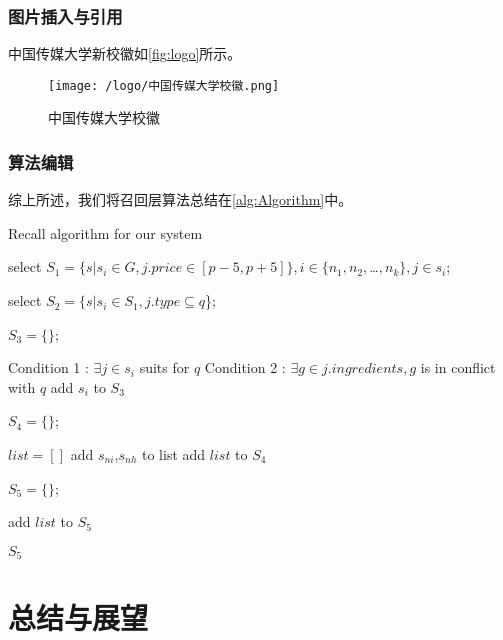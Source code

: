 \subsection{图片插入与引用}
中国传媒大学新校徽如\autoref{fig:logo}所示。
\begin{figure}[htbp]
    \centering
    \texttt{[image: /logo/中国传媒大学校徽.png]}
    \caption{\label{fig:logo}中国传媒大学校徽}
\end{figure}

\subsection{算法编辑}
综上所述，我们将召回层算法总结在\autoref{alg:Algorithm}中。
\begin{algorithm}  
    \caption{Recall algorithm for our system}
    \label{alg:Algorithm}
    
    select $S_1 = \{s|s_i \in {G}, j.price \in [p-5, p+5] \}, i \in \{n_1,n_2,$…$,n_k\} , j \in s_i$;   
    
    select $S_2 = \{s|s_i \in {S_1}, j.type  \subseteq q $\}; 
    
    $S_3=\{\}$;
    
    {
      Condition 1 : $\exists j \in s_i$ suits for $q$\;
      Condition 2 : $\exists g \in j.ingredients, g$ is in conflict with $q$\;
      {
        add $s_i$ to $S_3$\;
      }
    }

    $S_4=\{\}$;

    {
       $list = []$ \;
      {
        {
          {
            add $s_{ni}$,$s_{nh}$ to list\;
          }
        }
      }
      add $list$ to $S_4$\;
    }

    $S_5=\{\}$;

    {
        {
            add $list$ to $S_5$\;
        }
    }

    \Return $S_5$\;  
\end{algorithm}  

\chapter{总结与展望}